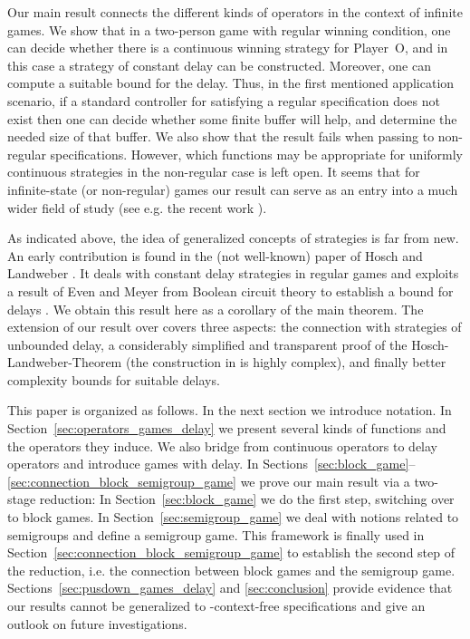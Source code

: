 \documentclass[fleqn,envcountsame]{LMCS}
\newcommand{\pO}{Player~O\xspace}
\newcommand{\ie}{i.e.\xspace}
\newcommand{\eg}{e.g.\xspace}
\begin{document}
Our main result connects the different kinds of operators
in the context of infinite games. We show that
in a two-person game with regular winning condition, one can decide whether
there is a continuous winning strategy for \pO, and in this case 
a strategy of constant delay can be constructed.
Moreover, one can compute a suitable bound  for the delay.
Thus, in the first mentioned application scenario, if a standard
controller for satisfying a regular specification does not exist then
one can decide whether some finite buffer will help, and determine
the needed size of that buffer. We also show that the result fails when
passing to non-regular specifications. However, which functions may be
appropriate for uniformly continuous strategies in the non-regular
case is left open. It seems that for infinite-state (or non-regular)
games our result can serve as an entry into a much wider field of study
(see \eg the recent work \cite{FLZ11}).

As indicated above, the idea of generalized concepts of strategies is
far from new. An early contribution is found in the (not well-known)
paper of Hosch and Landweber \cite{HL72FinDelSol}. It deals with constant
delay strategies in regular games and exploits a result of Even and Meyer
from Boolean circuit theory
to establish a bound for delays \cite{EM69SeqBoolEq}.
We obtain this result here as a corollary of the main theorem.
The extension of our result over \cite{HL72FinDelSol} covers
three aspects: the connection with strategies of unbounded delay,
a considerably simplified and transparent proof of the Hosch-Landweber-Theorem
(the construction in \cite{HL72FinDelSol} is highly complex),
and finally better complexity bounds for suitable delays.

This paper is organized as follows.
In the next section we introduce notation.
In Section~\ref{sec:operators_games_delay} we present several kinds
of functions and the operators they induce.
We also bridge from continuous operators to delay operators
and introduce games with delay.
In Sections~\ref{sec:block_game}--\ref{sec:connection_block_semigroup_game}
we prove our main result via a two-stage reduction:
In Section~\ref{sec:block_game} we do the first step,
switching over to block games.
In Section~\ref{sec:semigroup_game} we deal with notions
related to semigroups
and define a semigroup game.
This framework is finally used in Section~\ref{sec:connection_block_semigroup_game}
to establish the second step of the reduction, \ie the connection between
block games and the semigroup game.
Sections~\ref{sec:pusdown_games_delay} and \ref{sec:conclusion}
provide evidence that our results cannot be generalized
to -context-free specifications and give an outlook
on future investigations.
\end{document}
